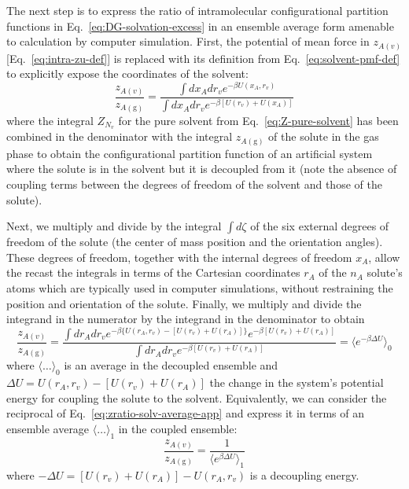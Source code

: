 \documentclass[9pt,bestpractices]{livecoms}
\begin{document}
The next step is to express the ratio of intramolecular configurational partition functions in Eq.~\ref{eq:DG-solvation-excess} in an ensemble average form amenable to calculation by computer simulation. First, the potential of mean force in $z_{A(v)}$ [Eq.~\ref{eq:intra-zu-def}] is replaced with its definition from Eq.~\ref{eq:solvent-pmf-def} to explicitly expose the coordinates of the solvent:
\begin{equation}
  \frac{z_{A(v)}}{z_{A(\mathrm{g})}} =
  \frac{
    \int dx_A dr_v e^{-\beta U(x_A, r_v)}
  }{
    \int dx_A dr_v e^{-\beta [U(r_v) + U(x_A)] }
  }
\end{equation}
where the integral $Z_{N_v}$ for the pure solvent from Eq.~\ref{eq:Z-pure-solvent} has been combined in the denominator with the integral $z_{A(\mathrm{g})}$ of the solute in the gas phase to obtain the configurational partition function of an artificial system where the solute is in the solvent but it is decoupled from it (note the absence of coupling terms between the degrees of freedom of the solvent and those of the solute).

Next, we multiply and divide by the integral $\int d\zeta$ of the six external degrees of freedom of the solute (the center of mass position and the orientation angles). These degrees of freedom, together with the internal degrees of freedom $x_A$, allow the recast the integrals in terms of the Cartesian coordinates $r_A$ of the $n_A$ solute's atoms which are typically used in computer simulations, without restraining the position and orientation of the solute. Finally, we multiply and divide the integrand in the numerator by the integrand in the denominator to obtain
\begin{equation}
  \frac{z_{A(v)}}{z_{A(\mathrm{g})}} =
  \frac{
    \int dr_A  dr_v  e^{-\beta \{ U(r_A, r_v) -  [ U(r_v) + U(r_A) ] \}} e^{-\beta [U(r_v) + U(  r_A  )] } 
  }{
    \int dr_A dr_v e^{-\beta [U(r_v) + U( r_A  )] } 
  } = \langle e^{-\beta \Delta U} \rangle_0
  \label{eq:zratio-solv-average-app}
\end{equation}
where $\langle \ldots \rangle_0$ is an average in the decoupled ensemble and $\Delta U =  U(r_A , r_v) -  [ U(r_v) + U(r_A ) ]$ the change in the system's potential energy for coupling the solute to the solvent. Equivalently, we can consider the reciprocal of Eq.~\ref{eq:zratio-solv-average-app} and express it in terms of an ensemble average $\langle \ldots \rangle_1$ in the coupled ensemble:
\begin{equation}
  \frac{z_{A(v)}}{z_{A(\mathrm{g})}} = \frac{1}{\langle e^{\beta \Delta U} \rangle_1}
\end{equation}
where $-\Delta U = [ U(r_v) + U(r_A ) ] - U(r_A , r_v)$ is a decoupling energy.
\end{document}
